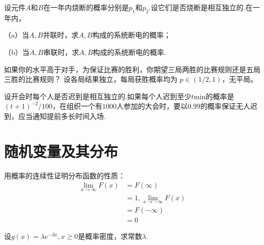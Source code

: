 \begin{exercise}[串联与并联可靠性]\label{q:Y2.32}
设元件$A$和$B$在一年内烧断的概率分别是$p_1$和$p_2$.设它们是否烧断是相互独立的.在一年内，

（a）当$A,B$并联时，求$A,B$构成的系统断电的概率；

（b）当$A,B$串联时，求$A,B$构成的系统断电的概率.\par{}\end{exercise}

\begin{exercise}[比赛局数与胜率]\label{q:Y2.33}
如果你的水平高于对手，为保证比赛的胜利，你期望三局两胜的比赛规则还是五局三胜的比赛规则？ 设各局结果独立，每局获胜概率均为 $p\in(1/2,1)$，无平局。\par{}\end{exercise}

\begin{exercise}[集体迟到的提前量]\label{q:Y2.34}
设开会时每个人是否迟到是相互独立的.如果每个人迟到至少$t$min的概率是$(t+1)^{-2}/100$，在组织一个有$1000$人参加的大会时，要以$0.99$的概率保证无人迟到，应当通知提前多长时间入场.\par{}\end{exercise}

\clearpage\section{随机变量及其分布}

\begin{exercise}[分布函数的无穷远极限]\label{q:Y3.1}
用概率的连续性证明分布函数的性质：
\[\begin{aligned}\mathop {\lim }\limits_{x \to \infty } F(x) &= F(\infty ) \\&= 1,\mathop {\lim }\limits_{x \to  - \infty } F(x) \\&= F( - \infty ) \\&= 0\end{aligned}\]\par{}\end{exercise}

\begin{exercise}[指数型密度的归一化]\label{q:Y3.2}
设$g(x)=\lambda e^{-3x},x\geqslant 0$是概率密度，求常数$\lambda$.\par{}\end{exercise}

